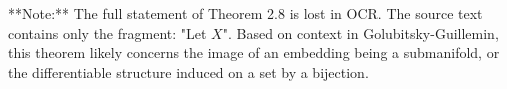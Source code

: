 **Note:** The full statement of Theorem 2.8 is lost in OCR. The source text contains only the fragment: "Let $X$". Based on context in Golubitsky-Guillemin, this theorem likely concerns the image of an embedding being a submanifold, or the differentiable structure induced on a set by a bijection.
